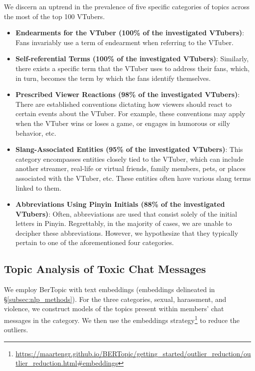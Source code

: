 We discern an uptrend in the prevalence of five specific categories of topics across the most of the top 100 VTubers.

\begin{itemize}[leftmargin=*]
    \item \textbf{Endearments for the VTuber (100\% of the investigated VTubers)}: Fans invariably use a term of endearment when referring to the VTuber. 
    \item \textbf{Self-referential Terms (100\% of the investigated VTubers)}: Similarly, there exists a specific term that the VTuber uses to address their fans, which, in turn, becomes the term by which the fans identify themselves. 
    \item \textbf{Prescribed Viewer Reactions (98\% of the investigated VTubers)}: There are established conventions dictating how viewers should react to certain events about the VTuber. For example, these conventions may apply when the VTuber wins or loses a game, or engages in humorous or silly behavior, etc. 
    \item \textbf{Slang-Associated Entities (95\% of the investigated VTubers)}: This category encompasses entities closely tied to the VTuber, which can include another streamer, real-life or virtual friends, family members, pets, or places associated with the VTuber, etc. These entities often have various slang terms linked to them. 
    \item \textbf{Abbreviations Using Pinyin Initials (88\% of the investigated VTubers)}: Often, abbreviations are used that consist solely of the initial letters in Pinyin. Regrettably, in the majority of cases, we are unable to decipher these abbreviations. However, we hypothesize that they typically pertain to one of the aforementioned four categories. 
\end{itemize}


\subsection{Topic Analysis of Toxic Chat Messages}
\label{subsec:appendix_toxic_topic_analysis}

We employ BerTopic with text embeddings (embeddings delineated in \S\ref{subsec:nlp_methods}). 
For the three categories, sexual, harassment, and violence, we construct models of the topics present within members' chat messages in the category. We then use the embeddings strategy\footnote{\url{https://maartengr.github.io/BERTopic/getting\_started/outlier\_reduction/outlier\_reduction.html\#embeddings}} to reduce the outliers. 

